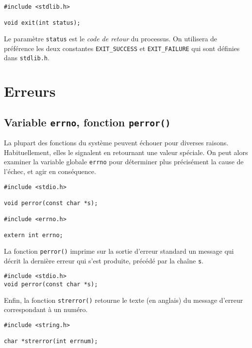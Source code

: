 \extrait
\begin{lstlisting}
#include <stdlib.h>
  
void exit(int status);
\end{lstlisting}


Le paramètre \texttt{status} est le \emph{code de retour} du processus.
On utilisera de préférence les deux constantes 
\texttt{EXIT\_SUCCESS} et \texttt{EXIT\_FAILURE} qui sont définies dans
\texttt{stdlib.h}.

\section{Erreurs}


\subsection{Variable \texttt{errno}, fonction \texttt{perror()} }


La plupart des fonctions du système peuvent échouer pour diverses
raisons. Habituellement, elles le signalent en retournant une valeur
spéciale.  On peut alors examiner la variable globale \texttt{errno}
pour déterminer plus précisément la cause de l'échec, et agir en
conséquence.

\extrait
\begin{lstlisting}
#include <stdio.h>

void perror(const char *s);

#include <errno.h>

extern int errno;
\end{lstlisting}


La fonction \texttt{perror()} imprime sur la sortie
d'erreur standard un message qui décrit la dernière erreur qui s'est
produite, précédé par la chaîne \texttt{s}.


\extrait
\begin{lstlisting}
#include <stdio.h>
void perror(const char *s);
\end{lstlisting}


Enfin, la fonction \texttt{strerror()} retourne le texte (en anglais)
du message d'erreur correspondant à un numéro.


\extrait
\begin{lstlisting}
#include <string.h>

char *strerror(int errnum);
\end{lstlisting}


